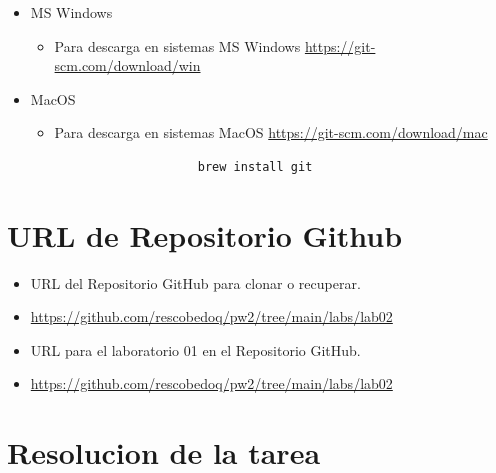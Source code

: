 \documentclass{article}
\begin{document}
\begin{itemize}
\begin{itemize}
\begin{itemize}
\begin{lstlisting}
                apt-get install git    
                \end{lstlisting}
            \end{itemize}
            \item MS Windows
            \begin{itemize}
                \item Para descarga en sistemas MS Windows \url{https://git-scm.com/download/win}
            \end{itemize}
            \item MacOS
            \begin{itemize}
                \item Para descarga en sistemas MacOS \url{https://git-scm.com/download/mac}
                \begin{verbatim}
                    brew install git
                \end{verbatim}
            \end{itemize}
        \end{itemize}
	\end{itemize}
	
	\section{URL de Repositorio Github}
	\begin{itemize}
		\item URL del Repositorio GitHub para clonar o recuperar.
		\item \url{https://github.com/rescobedoq/pw2/tree/main/labs/lab02}
		\item URL para el laboratorio 01 en el Repositorio GitHub.
		\item \url{https://github.com/rescobedoq/pw2/tree/main/labs/lab02}
	\end{itemize}
	
	\section{Resolucion de la tarea}
	
\end{document}
